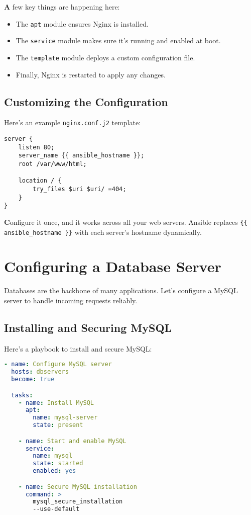 \textbf{A} few key things are happening here:
\begin{itemize}
    \item The \texttt{apt} module ensures Nginx is installed.
    \item The \texttt{service} module makes sure it's running and enabled at boot.
    \item The \texttt{template} module deploys a custom configuration file.
    \item Finally, Nginx is restarted to apply any changes.
\end{itemize}

\subsection{Customizing the Configuration}

Here's an example \texttt{nginx.conf.j2} template:
\begin{lstlisting}[language=nginx, caption=Custom Nginx Configuration Template]
server {
    listen 80;
    server_name {{ ansible_hostname }};
    root /var/www/html;

    location / {
        try_files $uri $uri/ =404;
    }
}
\end{lstlisting}

\textbf{C}onfigure it once, and it works across all your web servers. Ansible replaces \texttt{\{\{ ansible\_hostname \}\}} with each server's hostname dynamically.


\section{Configuring a Database Server}

Databases are the backbone of many applications. Let's configure a MySQL server to handle incoming requests reliably.

\subsection{Installing and Securing MySQL}

Here's a playbook to install and secure MySQL:
\begin{lstlisting}[language=yaml, caption=Playbook for MySQL Server Configuration]
- name: Configure MySQL server
  hosts: dbservers
  become: true

  tasks:
    - name: Install MySQL
      apt:
        name: mysql-server
        state: present

    - name: Start and enable MySQL
      service:
        name: mysql
        state: started
        enabled: yes

    - name: Secure MySQL installation
      command: >
        mysql_secure_installation
        --use-default
\end{lstlisting}

